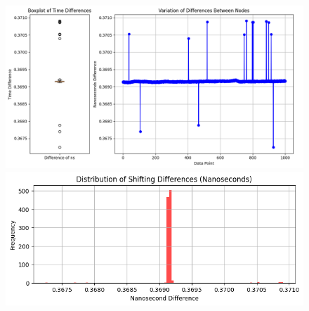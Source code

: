 \begin{figure}
    \centering
    \includegraphics[width=\textwidth]{./img/time_sync_node.png}
    \includegraphics[width=\textwidth]{./img/time_sync_distribution.png}
\end{figure}